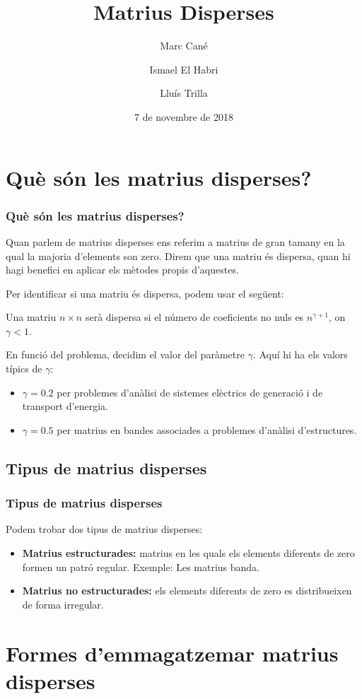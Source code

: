 \documentclass[8pt]{beamer}
\title{Matrius Disperses}
\author{Marc Cané \and Ismael El Habri \and Lluís Trilla}
\date[KPT 2004] %
{7 de novembre de 2018}
\begin{document}
\frame{\titlepage}

\section{Què són les matrius disperses?}
  \begin{frame}
    \frametitle{Què són les matrius disperses?}
    Quan parlem de matrius disperses ens referim a matrius de gran tamany en la qual la majoria d'elements son zero. Direm que una matriu és dispersa, quan hi hagi benefici en aplicar els mètodes propis d'aquestes. 
  \end{frame}
  \begin{frame}
   Per identificar si una matriu és dispersa, podem usar el següent:

Una matriu $n \times n$ serà dispersa si el número de coeficients no nuls es $n^{\gamma+1}$, on $\gamma < 1$.

En funció del problema, decidim el valor del paràmetre $\gamma$. Aquí hi ha els valors típics de $\gamma$:
\begin{itemize}
\item $\gamma=0.2$ per problemes d'anàlisi de sistemes elèctrics de generació i de transport d'energia.
\item $\gamma=0.5$ per matrius en bandes associades a problemes d'anàlisi d'estructures.
\end {itemize}
  \end{frame}
  
  \subsection{Tipus de matrius disperses}
  \begin{frame}
  \frametitle{Tipus de matrius disperses}
Podem trobar dos tipus de matrius disperses:
\begin{itemize}
\item \textbf{Matrius estructurades:} matrius en les quals els elements diferents de zero formen un patró regular. Exemple: Les matrius banda.
\item \textbf{Matrius no estructurades:} els elements diferents de zero es distribueixen de forma irregular.
\end{itemize}  
  \end{frame}
  
%
%  

\section[Emmagatzematge]{Formes d'emmagatzemar matrius disperses}
\end{document}
